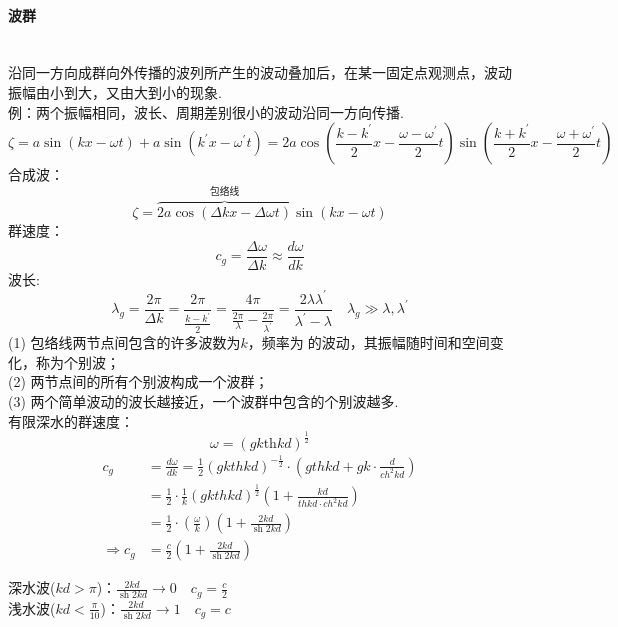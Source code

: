 \documentclass[a4paper,12pt]{article}
\begin{document}
    \paragraph{波群}~{}\\
    沿同一方向成群向外传播的波列所产生的波动叠加后，在某一固定点观测点，波动振幅由小到大，又由大到小的现象.\\
    例：两个振幅相同，波长、周期差别很小的波动沿同一方向传播.
    \[
        \zeta=a \sin (k x-\omega t)+a \sin \left(k^{\prime} x-\omega^{\prime} t\right)=2 a \cos \left(\frac{k-k^{\prime}}{2} x-\frac{\omega-\omega^{\prime}}{2} t\right) \sin \left(\frac{k+k^{\prime}}{2} x-\frac{\omega+\omega^{\prime}}{2} t\right)
    \]
    合成波：
    \[
        \zeta=\overbrace{2 a \cos (\Delta k x-\Delta \omega t)}^{\mbox{包络线}} \sin (k x-\omega t)
    \]
    群速度：
    \[
        c_g=\frac{\Delta \omega}{\Delta k}\approx\frac{d\omega}{dk}
    \]
    波长:
    \[
        \lambda_{g}=\frac{2 \pi}{\Delta k}=\frac{2 \pi}{\frac{k-k^{\prime}}{2}}=\frac{4 \pi}{\frac{2 \pi}{\lambda}-\frac{2 \pi}{\lambda^{\prime}}}=\frac{2 \lambda \lambda^{\prime}}{\lambda^{\prime}-\lambda}\quad \lambda_g\gg \lambda,\lambda^{\prime}
    \]
    (1) 包络线两节点间包含的许多波数为$k$，频率为的波动，其振幅随时间和空间变化，称为个别波；\\
    (2) 两节点间的所有个别波构成一个波群；\\
    (3) 两个简单波动的波长越接近，一个波群中包含的个别波越多.\\
    有限深水的群速度：
    \[
        \omega=\left(gk\mathrm{th} kd\right)^{\frac{1}{2}}
    \]
    \[
        \begin{aligned}
            c_{g} &=\frac{d \omega}{d k}=\frac{1}{2}(g k t h k d)^{-\frac{1}{2}} \cdot\left(g t h k d+g k \cdot \frac{d}{c h^{2} k d}\right) \\
            &=\frac{1}{2} \cdot \frac{1}{k}(g k t h k d)^{\frac{1}{2}}\left(1+\frac{k d}{t h k d \cdot c h^{2} k d}\right) \\
            &=\frac{1}{2} \cdot\left(\frac{\omega}{k}\right)\left(1+\frac{2 k d}{\operatorname{sh} 2 k d}\right) \\
            \Rightarrow c_{g}&=\frac{c}{2}\left(1+\frac{2 k d}{\operatorname{sh} 2 k d}\right)
        \end{aligned}
    \]
    \begin{spacing}{2}
        深水波($kd>\pi$)：$\displaystyle \frac{2 k d}{\operatorname{sh} 2 k d} \rightarrow 0 \quad c_{g}=\frac{c}{2}$\\
    浅水波($\displaystyle kd<\frac{\pi}{10}$)：$ \displaystyle   \frac{2 k d}{\operatorname{sh} 2 k d} \rightarrow 1 \quad c_{g}=c$
    \end{spacing}
\end{document}
